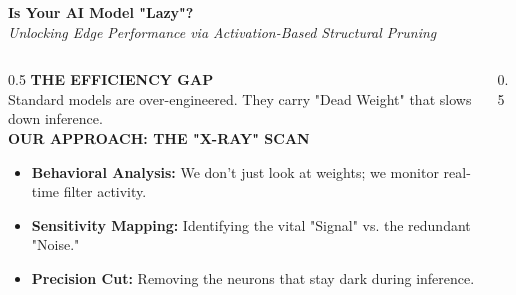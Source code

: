 \documentclass[10pt, aspectratio=169]{beamer}
\begin{document}
\begin{frame}
    \vspace{0.2cm}
    \begin{center}
        \textcolor{neonblue}{\Large \textbf{Is Your AI Model "Lazy"?}} \\
        \small \textit{Unlocking Edge Performance via Activation-Based Structural Pruning}
    \end{center}
    
    \begin{columns}[T]
        \begin{column}{0.5\textwidth}
            \vspace{0.4cm}
            \textbf{\small THE EFFICIENCY GAP} \\
            \vspace{0.2cm}
            Standard models are over-engineered. They carry "Dead Weight" that slows down inference. \\
            \vspace{0.5cm}
            \textbf{\small OUR APPROACH: THE "X-RAY" SCAN} \\
            \vspace{0.2cm}
            \begin{itemize}
                \item \small \textbf{Behavioral Analysis:} We don't just look at weights; we monitor real-time filter activity.
                \item \small \textbf{Sensitivity Mapping:} Identifying the vital "Signal" vs. the redundant "Noise."
                \item \small \textbf{Precision Cut:} Removing the neurons that stay dark during inference.
            \end{itemize}
        \end{column}
        
        \begin{column}{0.5\textwidth}
            \centering
\end{column}
\end{columns}
\end{frame}
\end{document}
